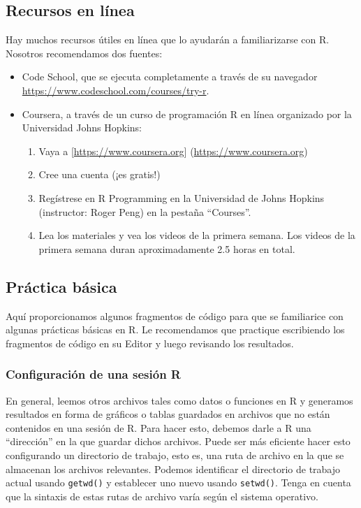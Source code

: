 \documentclass[
  12pt,
  spanish,
]{book}
\providecommand{\tightlist}{%
  \setlength{\itemsep}{0pt}\setlength{\parskip}{0pt}}
\begin{document}
\hypertarget{recursos-en-luxednea}{%
\subsection{Recursos en línea}\label{recursos-en-luxednea}}

Hay muchos recursos útiles en línea que lo ayudarán a familiarizarse con R. Nosotros recomendamos dos fuentes:

\begin{itemize}
\tightlist
\item
  Code School, que se ejecuta completamente a través de su navegador \url{https://www.codeschool.com/courses/try-r}.
\item
  Coursera, a través de un curso de programación R en línea organizado por la Universidad Johns Hopkins:

  \begin{enumerate}
  \def\labelenumi{\roman{enumi}.}
  \tightlist
  \item
    Vaya a {[}\url{https://www.coursera.org}{]} (\url{https://www.coursera.org})
  \item
    Cree una cuenta (¡es gratis!)
  \item
    Regístrese en R Programming en la Universidad de Johns Hopkins (instructor: Roger Peng) en la pestaña ``Courses''.
  \item
    Lea los materiales y vea los videos de la primera semana. Los videos de la primera semana duran aproximadamente 2.5 horas en total.
  \end{enumerate}
\end{itemize}

\hypertarget{pruxe1ctica-buxe1sica}{%
\subsection{Práctica básica}\label{pruxe1ctica-buxe1sica}}

Aquí proporcionamos algunos fragmentos de código para que se familiarice con algunas prácticas básicas en R. Le recomendamos que practique escribiendo los fragmentos de código en su Editor y luego revisando los resultados.

\hypertarget{configuraciuxf3n-de-una-sesiuxf3n-r}{%
\subsubsection{Configuración de una sesión R}\label{configuraciuxf3n-de-una-sesiuxf3n-r}}

En general, leemos otros archivos tales como datos o funciones en R y generamos resultados en forma de gráficos o tablas guardados en archivos que no están contenidos en una sesión de R. Para hacer esto, debemos darle a R una ``dirección'' en la que guardar dichos archivos. Puede ser más eficiente hacer esto configurando un directorio de trabajo, esto es, una ruta de archivo en la que se almacenan los archivos relevantes. Podemos identificar el directorio de trabajo actual usando \texttt{getwd()} y establecer uno nuevo usando \texttt{setwd()}. Tenga en cuenta que la sintaxis de estas rutas de archivo varía según el sistema operativo.
\end{document}
